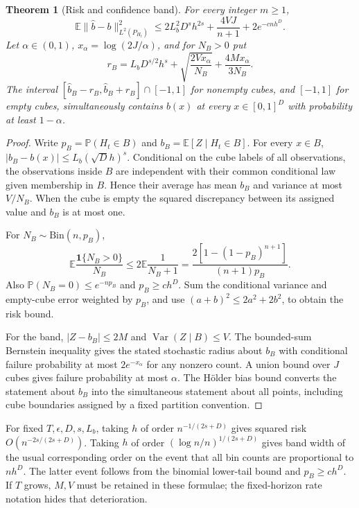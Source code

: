 \documentclass[11pt,a4paper]{article}
\newtheorem{theorem}{Theorem}[section]
\theoremstyle{definition}
\theoremstyle{remark}
\newcommand{\E}{\mathbb E}
\newcommand{\Prb}{\mathbb P}
\newcommand{\ind}{\mathbf 1}
\newcommand{\Var}{\operatorname{Var}}
\begin{document}
\begin{theorem}[Risk and confidence band]
For every integer $m\ge1$,
\[
 \E\|\hat b-b\|_{L^2(P_{H_t})}^2
 \le 2L_b^2D^s h^{2s}+\frac{4VJ}{n+1}+2e^{-cnh^D}.
\]
Let $\alpha\in(0,1)$, $x_\alpha=\log(2J/\alpha)$, and for $N_B>0$ put
\[
 r_B=L_bD^{s/2}h^s+
       \sqrt{\frac{2Vx_\alpha}{N_B}}+
       \frac{4Mx_\alpha}{3N_B}.
\]
The interval $[\hat b_B-r_B,\hat b_B+r_B]\cap[-1,1]$ for nonempty cubes, and $[-1,1]$ for empty cubes, simultaneously contains $b(x)$ at every $x\in[0,1]^D$ with probability at least $1-\alpha$.
\end{theorem}
\begin{proof}
Write $p_B=\Prb(H_t\in B)$ and $b_B=\E[Z\mid H_t\in B]$. For every $x\in B$, $|b_B-b(x)|\le L_b(\sqrt D h)^s$. Conditional on the cube labels of all observations, the observations inside $B$ are independent with their common conditional law given membership in $B$. Hence their average has mean $b_B$ and variance at most $V/N_B$. When the cube is empty the squared discrepancy between its assigned value and $b_B$ is at most one.

For $N_B\sim\mathrm{Bin}(n,p_B)$,
\[
 \E\frac{\ind\{N_B>0\}}{N_B}
 \le2\E\frac1{N_B+1}
 =\frac{2[1-(1-p_B)^{n+1}]}{(n+1)p_B}.
\]
Also $\Prb(N_B=0)\le e^{-np_B}$ and $p_B\ge ch^D$. Sum the conditional variance and empty-cube error weighted by $p_B$, and use $(a+b)^2\le2a^2+2b^2$, to obtain the risk bound.

For the band, $|Z-b_B|\le2M$ and $\Var(Z\mid B)\le V$. The bounded-sum Bernstein inequality gives the stated stochastic radius about $b_B$ with conditional failure probability at most $2e^{-x_\alpha}$ for any nonzero count. A union bound over $J$ cubes gives failure probability at most $\alpha$. The H\"older bias bound converts the statement about $b_B$ into the simultaneous statement about all points, including cube boundaries assigned by a fixed partition convention.
\end{proof}

For fixed $T,\epsilon,D,s,L_b$, taking $h$ of order $n^{-1/(2s+D)}$ gives squared risk $O(n^{-2s/(2s+D)})$. Taking $h$ of order $(\log n/n)^{1/(2s+D)}$ gives band width of the usual corresponding order on the event that all bin counts are proportional to $nh^D$. The latter event follows from the binomial lower-tail bound and $p_B\ge ch^D$. If $T$ grows, $M,V$ must be retained in these formulae; the fixed-horizon rate notation hides that deterioration.
\end{document}
